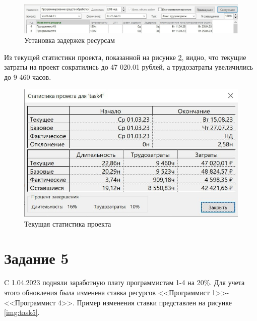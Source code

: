 \begin{figure}[H]
	\begin{center}
		\includegraphics[scale=0.3]{inc/img/task4-fix-overloads.jpg}
	\end{center}
	\captionsetup{justification=centering}
	\caption{Установка задержек ресурсам}
	\label{img:task4-overloads-fix}
\end{figure}

Из текущей статистики проекта, показанной на рисунке \ref{img:task4-stat}, видно, что текущие затраты на проект сократились до 47 020.01 рублей, а трудозатраты увеличились до 9 460 часов.

\begin{figure}[H]
	\begin{center}
		\includegraphics[scale=0.3]{inc/img/task4-stat.jpg}
	\end{center}
	\captionsetup{justification=centering}
	\caption{Текущая статистика проекта}
	\label{img:task4-stat}
\end{figure}

\section*{Задание 5}

C 1.04.2023 подняли заработную плату программистам 1-4 на 20\%. Для учета этого обновления была изменена ставка ресурсов <<Программист 1>>-<<Программист 4>>. Пример изменения ставки представлен на рисунке \ref{img:task5}.


